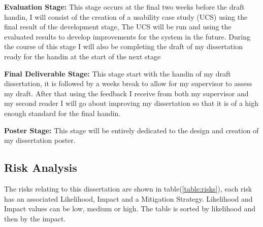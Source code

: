 \documentclass[12pt]{article}  %
\begin{document}
\newpage
\noindent
\textbf{Evaluation Stage: } This stage occurs at the final two weeks before the draft handin, I will consist of the creation of a usability case study (UCS) using the final result of the development stage, The UCS will be run and using the evaluated results to develop improvements for the system in the future. During the course of this stage I will also be completing the draft of my dissertation ready for the handin at the start of the next stage\bigskip

\noindent
\textbf{Final Deliverable Stage:} This stage start with the handin of my draft dissertation, it is followed by a weeks break to allow for my supervisor to assess my draft. After that using the feedback I receive from both my supervisor and my second reader I will go about improving my dissertation so that it is of a high enough standard for the final handin.\bigskip

\noindent
\textbf{Poster Stage:} This stage will be entirely dedicated to the design and creation of my dissertation poster.






\newpage
\subsection{Risk Analysis}

The risks relating to this dissertation are shown in table(\ref{table:risks}), each risk has an associated Likelihood, Impact and a Mitigation Strategy. Likelihood and Impact values can be low, medium or high. The table is sorted by likelihood and then by the impact.
\end{document}
